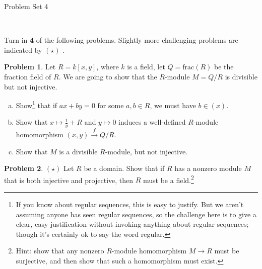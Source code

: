 \documentclass[11pt]{article}
\title{}
\date{\vspace{-0.5in}}
\theoremstyle{definition}
\newtheorem{problem}{Problem}
\begin{document}
\thispagestyle{fancy}
\pagestyle{fancy}

\vspace{3em}

\begin{center}
	{\LARGE Problem Set 4}
\end{center}


\


\noindent
Turn in {\bf 4} of the following problems. Slightly more challenging problems are indicated by $(\star)$ .

%
\noindent

\vspace{2em}




\begin{problem}
	Let $R=k[x,y]$, where $k$ is a field, let $Q = \textrm{frac}(R)$ be the fraction field of $R$. We are going to show that the $R$-module $M = Q/R$ is divisible but not injective.
	\begin{enumerate}[a)]
		\item Show\footnote{If you know about regular sequences, this is easy to justify. But we aren't assuming anyone has seen regular sequences, so the challenge here is to give a clear, easy justification without invoking anything about regular sequences; though it's certainly ok to say the word regular.} that if $ax + by = 0$ for some $a, b \in R$, we must have $b \in (x)$.
		\item Show that $x \mapsto \frac{1}{y} + R$ and $y \mapsto 0$ induces a well-defined $R$-module homomorphism $(x,y) \xrightarrow{\, f \,} Q/R$.
		\item Show that $M$ is a divisible $R$-module, but not injective.
	\end{enumerate}
\end{problem}


\vspace{1em}

\begin{problem}
	$(\star)$ Let $R$ be a domain. Show that if $R$ has a nonzero module $M$ that is both injective and projective, then $R$ must be a field.\footnote{Hint: show that any nonzero $R$-module homomorphism $M \longrightarrow R$ must be surjective, and then show that such a homomorphism must exist.}
\end{problem}
\end{document}
